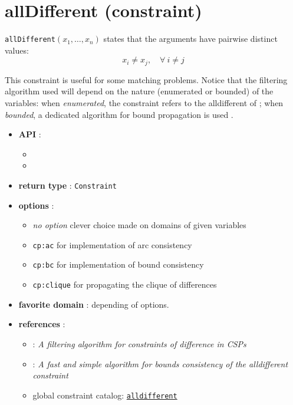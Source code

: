 \label{alldifferent}
\hypertarget{alldifferent}{}

\section{allDifferent (constraint)}\label{alldifferent:alldifferentconstraint}\hypertarget{alldifferent:alldifferentconstraint}{}
\begin{notedef}
  \texttt{allDifferent}$(x_1,\ldots,x_n)$ states that the arguments have pairwise distinct values:
 $$x_i \neq x_j,\quad \forall\ i\neq j$$  
\end{notedef}
This constraint is useful for some matching problems.
Notice that the filtering algorithm used will depend on the nature (enumerated or bounded) of the variables: 
when \emph{enumerated}, the constraint refers to the alldifferent of \cite{ReginAAAI94};
when \emph{bounded}, a dedicated algorithm for bound propagation is used \cite{LopezIJCAI03}.

\begin{itemize}
	\item \textbf{API} :
	\begin{itemize}
		\item {}
		\item {}
	\end{itemize}
	\item \textbf{return type} : \texttt{Constraint}
	\item \textbf{options} :
	\begin{itemize}
		\item \emph{no option} clever choice made on domains of given variables
		\item \texttt{cp:ac} for \cite{ReginAAAI94} implementation of arc consistency
		\item \texttt{cp:bc} for \cite{LopezIJCAI03} implementation of bound consistency
		\item \texttt{cp:clique} for propagating the clique of differences
	\end{itemize}
	\item \textbf{favorite domain} : depending of options.
	\item \textbf{references} :
      \begin{itemize}
      \item  \cite{ReginAAAI94}: \emph{A filtering algorithm for constraints of difference in CSPs}
      \item  \cite{LopezIJCAI03}: \emph{A fast and simple algorithm for bounds consistency of the alldifferent constraint}
      \item global constraint catalog: \href{http://www.emn.fr/x-info/sdemasse/gccat/Calldifferent.html}{\tt alldifferent}
      \end{itemize}
\end{itemize}



